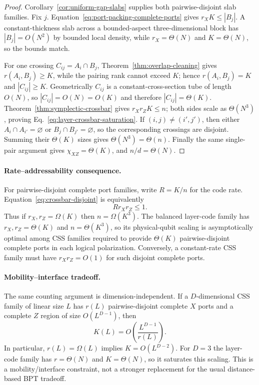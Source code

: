 \documentclass[aps,prx,reprint,superscriptaddress,nofootinbib,floatfix,longbibliography]{revtex4-2}
\theoremstyle{definition}
\begin{document}
\begin{proof}
Corollary~\ref{cor:uniform-gap-slabs} supplies both pairwise-disjoint slab
families.  Fix $j$.  Equation~\eqref{eq:port-packing-complete-ports} gives
$r_XK\le |B_j|$.  A constant-thickness slab across a bounded-aspect
three-dimensional block has $|B_j|=O(N^2)$ by bounded local density, while
$r_X=\Theta(N)$ and $K=\Theta(N)$, so the bounds match.

For one crossing $C_{ij}=A_i\cap B_j$,
Theorem~\ref{thm:overlap-cleaning} gives $r(A_i,B_j)\ge K$, while the pairing
rank cannot exceed $K$; hence $r(A_i,B_j)=K$ and $|C_{ij}|\ge K$.
Geometrically $C_{ij}$ is a constant-cross-section tube of length $O(N)$, so
$|C_{ij}|=O(N)=O(K)$ and therefore $|C_{ij}|=\Theta(K)$.
Theorem~\ref{thm:symplectic-crossbar} gives $r_Xr_ZK\le n$; both sides scale
as $\Theta(N^3)$, proving Eq.~\eqref{eq:layer-crossbar-saturation}.  If
$(i,j)\ne(i',j')$, then either $A_i\cap A_{i'}=\varnothing$ or
$B_j\cap B_{j'}=\varnothing$, so the corresponding crossings are disjoint.
Summing their $\Theta(K)$ sizes gives $\Theta(N^3)=\Theta(n)$.  Finally the
same single-pair argument gives $\chi_{XZ}=\Theta(K)$, and
$n/d=\Theta(N)$.
\end{proof}

\paragraph{Rate--addressability consequence.}
For pairwise-disjoint complete port families, write $R=K/n$ for the code
rate.  Equation~\eqref{eq:crossbar-disjoint} is equivalently
\begin{equation}
 Rr_Xr_Z\le1.
 \label{eq:rate-addressability}
\end{equation}
Thus if $r_X,r_Z=\Omega(K)$ then $n=\Omega(K^3)$.  The balanced layer-code
family has $r_X,r_Z=\Theta(K)$ and $n=\Theta(K^3)$, so its physical-qubit
scaling is asymptotically optimal among CSS families required to provide
$\Theta(K)$ pairwise-disjoint complete ports in each logical polarization.
Conversely, a constant-rate CSS family must have $r_Xr_Z=O(1)$ for such
disjoint complete ports.

\paragraph{Mobility--interface tradeoff.}
The same counting argument is dimension-independent.  If a $D$-dimensional CSS family of linear size $L$ has $r(L)$ pairwise-disjoint complete $X$ ports and a complete $Z$ region of size $O(L^{D-1})$, then
\begin{equation}
 K(L)=O\!\left(\frac{L^{D-1}}{r(L)}\right).
 \label{eq:mobility-interface}
\end{equation}
In particular, $r(L)=\Omega(L)$ implies $K=O(L^{D-2})$.  For $D=3$ the layer-code family has $r=\Theta(N)$ and $K=\Theta(N)$, so it saturates this scaling.  This is a mobility/interface constraint, not a stronger replacement for the usual distance-based BPT tradeoff.
\end{document}
